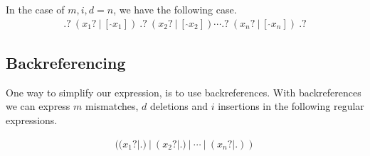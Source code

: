 \documentclass[12pt]{article}
\newcounter{subsubsubsection}[subsubsection]
\begin{document}
In the case of $m, i, d = n$, we have the following case.
\begin{eqnarray}
	.?\ (x_1?\ |\ [\ \hat{}x_1])\ .?\ (x_2?\ |\ [\ \hat{} x_2]) \cdots .?\ (x_n?\ |\ [\ \hat{}x_n])\ .? 
\end{eqnarray}





\subsection{Backreferencing}

One way to simplify our expression, is to use backreferences. With backreferences we can express $m$ mismatches, $d$ deletions and $i$ insertions in the following regular expressions.


\begin{eqnarray}
	((x_1?|.) \ | \ (x_2?|.) \ | \ \cdots \ | \ (x_n?|.))
\end{eqnarray}



\newpage


\nocite{*}

\end{document}
